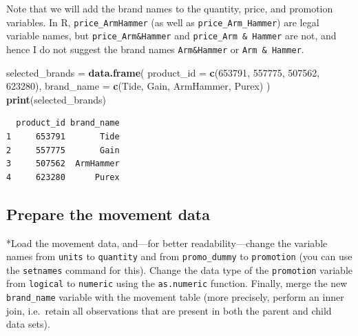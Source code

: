 \documentclass[
]{article}
\newenvironment{Shaded}{\begin{snugshade}}{\end{snugshade}}
\newcommand{\AttributeTok}[1]{\textcolor[rgb]{0.13,0.29,0.53}{#1}}
\newcommand{\DecValTok}[1]{\textcolor[rgb]{0.00,0.00,0.81}{#1}}
\newcommand{\FunctionTok}[1]{\textcolor[rgb]{0.13,0.29,0.53}{\textbf{#1}}}
\newcommand{\NormalTok}[1]{#1}
\newcommand{\OtherTok}[1]{\textcolor[rgb]{0.56,0.35,0.01}{#1}}
\newcommand{\StringTok}[1]{\textcolor[rgb]{0.31,0.60,0.02}{#1}}
\begin{document}
Note that we will add the brand names to the quantity, price, and
promotion variables. In R, \texttt{price\_ArmHammer} (as well as
\texttt{price\_Arm\_Hammer}) are legal variable names, but
\texttt{price\_Arm\&Hammer} and \texttt{price\_Arm\ \&\ Hammer} are not,
and hence I do not suggest the brand names \texttt{Arm\&Hammer} or
\texttt{Arm\ \&\ Hammer}.

\begin{Shaded}
\begin{Highlighting}[]
\NormalTok{selected\_brands }\OtherTok{=} \FunctionTok{data.frame}\NormalTok{(}
  \AttributeTok{product\_id =} \FunctionTok{c}\NormalTok{(}\DecValTok{653791}\NormalTok{, }\DecValTok{557775}\NormalTok{, }\DecValTok{507562}\NormalTok{, }\DecValTok{623280}\NormalTok{),}
  \AttributeTok{brand\_name =} \FunctionTok{c}\NormalTok{(}\StringTok{\textquotesingle{}Tide\textquotesingle{}}\NormalTok{, }\StringTok{\textquotesingle{}Gain\textquotesingle{}}\NormalTok{, }\StringTok{\textquotesingle{}ArmHammer\textquotesingle{}}\NormalTok{, }\StringTok{\textquotesingle{}Purex\textquotesingle{}}\NormalTok{)}
\NormalTok{)}
\FunctionTok{print}\NormalTok{(selected\_brands)}
\end{Highlighting}
\end{Shaded}

\begin{verbatim}
  product_id brand_name
1     653791       Tide
2     557775       Gain
3     507562  ArmHammer
4     623280      Purex
\end{verbatim}

\subsection{Prepare the movement data}\label{prepare-the-movement-data}

*Load the movement data, and---for better readability---change the
variable names from \texttt{units} to \texttt{quantity} and from
\texttt{promo\_dummy} to \texttt{promotion} (you can use the
\texttt{setnames} command for this). Change the data type of the
\texttt{promotion} variable from \texttt{logical} to \texttt{numeric}
using the \texttt{as.numeric} function. Finally, merge the new
\texttt{brand\_name} variable with the movement table (more precisely,
perform an inner join, i.e.~retain all observations that are present in
both the parent and child data sets).
\end{document}
